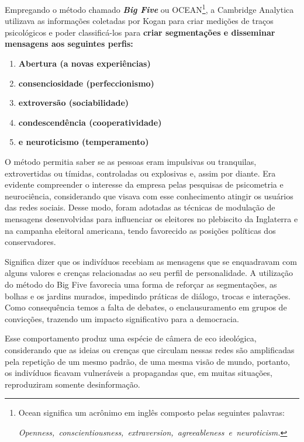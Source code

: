 Empregando o método chamado \emph{\textbf{Big Five}} ou OCEAN\footnote{Ocean
  significa um acrônimo em inglês composto pelas seguintes palavras:

  \emph{Openness,~conscientiousness,~extraversion,~agreeableness~e~neuroticism.}},
a Cambridge Analytica utilizava as informações coletadas por Kogan para
criar medições de traços psicológicos e poder classificá-los para
\textbf{criar segmentações e disseminar mensagens aos seguintes perfis:}

\begin{enumerate}
\def\labelenumi{\arabic{enumi})}
\item
  \textbf{Abertura (a novas experiências)}
\item
  \textbf{consenciosidade (perfeccionismo)}
\item
  \textbf{extroversão (sociabilidade)}
\item
  \textbf{condescendência (cooperatividade) }
\item
  \textbf{e neuroticismo (temperamento)}
\end{enumerate}

O método permitia saber se as pessoas eram impulsivas ou tranquilas,
extrovertidas ou tímidas, controladas ou explosivas e, assim por diante.
Era evidente compreender o interesse da empresa pelas pesquisas de
psicometria e neurociência, considerando que visava com esse
conhecimento atingir os usuários das redes sociais. Desse modo, foram
adotadas as técnicas de modulação de mensagens desenvolvidas para
influenciar os eleitores no plebiscito da Inglaterra e na campanha
eleitoral americana, tendo favorecido as posições políticas dos
conservadores.

Significa dizer que os indivíduos recebiam as mensagens que se
enquadravam com alguns valores e crenças relacionadas ao seu perfil de
personalidade. A utilização do método do Big Five favorecia uma forma de
reforçar as segmentações, as bolhas e os jardins murados, impedindo
práticas de diálogo, trocas e interações. Como consequência temos a
falta de debates, o enclausuramento em grupos de convicções, trazendo um
impacto significativo para a democracia.

Esse comportamento produz uma espécie de câmera de eco ideológica,
considerando que as ideias ou crenças que circulam nessas redes são
amplificadas pela repetição de um mesmo padrão, de uma mesma visão de
mundo, portanto, os indivíduos ficavam vulneráveis a propagandas que, em
muitas situações, reproduziram somente desinformação.

